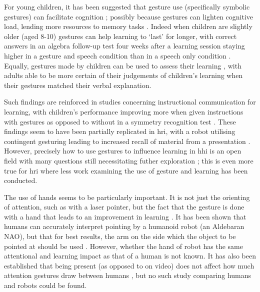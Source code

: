 For young children, it has been suggested that gesture use (specifically symbolic gestures) can facilitate cognition \citep{goodwyn1998encouraging}; possibly because gestures can lighten cognitive load, lending more resources to memory tasks \citep{goldin2001explaining}. Indeed when children are slightly older (aged 8-10) gestures can help learning to `last' for longer, with correct answers in an algebra follow-up test four weeks after a learning session staying higher in a gesture and speech condition than in a speech only condition \citep{cook2008gesturing}. Equally, gestures made by children can be used to assess their learning \citep{goldin1992assessing}, with adults able to be more certain of their judgements of children's learning when their gestures matched their verbal explanation.

Such findings are reinforced in studies concerning instructional communication for learning, with children's performance improving more when given instructions with gestures as opposed to without in a symmetry recognition test \citep{valenzeno2003teachers}. These findings seem to have been partially replicated in \acrshort{hri}, with a robot utilising contingent gesturing leading to increased recall of material from a presentation \citep{szafir2012pay}. However, precisely how to use gestures to influence learning in \acrshort{hhi} is an open field with many questions still necessitating futher exploration \citep{roth2001gestures}; this is even more true for \acrshort{hri} where less work examining the use of gesture and learning has been conducted.

The use of hands seems to be particularly important. It is not just the orienting of attention, such as with a laser pointer, but the fact that the gesture is done with a hand that leads to an improvement in learning \citep{rumme2008gestures}. It has been shown that humans can accurately interpret pointing by a humanoid robot (an Aldebaran NAO), but that for best results, the arm on the side which the object to be pointed at should be used \citep{wang2014directing}. However, whether the hand of robot has the same attentional and learning impact as that of a human is not known. It has also been established that being present (as opposed to on video) does not affect how much attention gestures draw between humans \citep{gullberg2002visual}, but no such study comparing humans and robots could be found.

